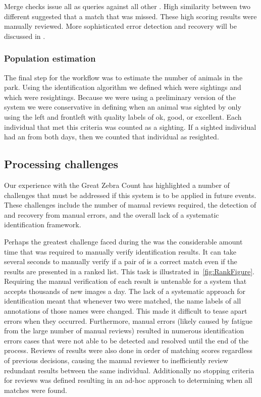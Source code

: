             Merge checks issue all \exemplars{} as queries against all other \exemplars{}. High similarity between
            two different \names{} suggested that a match that was missed. These high scoring results were manually
            reviewed. More sophisticated error detection and recovery will be discussed in .

        \subsubsection{Population estimation}
            The final step for the \GZC{} workflow was to estimate the number of animals in the park.  Using the
            identification algorithm we defined which \annots{} were sightings and which were resightings. Because we
            were using a preliminary version of the system we were conservative in defining when an animal was sighted
            by only using the left and frontleft \annots{} with quality labels of ok, good, or excellent.  Each
            individual that met this criteria was counted as a sighting.  If a sighted individual had an \annot{} from
            both days, then we counted that individual as resighted.

    \subsection{Processing challenges}
        Our experience with the Great Zebra Count has highlighted a number of challenges that must be addressed if this
        system is to be applied in future events. These challenges include the number of manual reviews required, the
        detection of and recovery from manual errors, and the overall lack of a systematic identification framework.

        Perhaps the greatest challenge faced during the \GZC{} was the
          considerable amount time that was required to manually verify
          identification results.
        It can take several seconds to manually verify if a pair of \annots{}
          is a correct match even if the results are presented in a ranked list.
        This task is illustrated in~\cref{fig:RankFigure}.
        Requiring the manual verification of each result is untenable for a
          system that accepts thousands of new images a day.
        The lack of a systematic approach for identification meant that
          whenever two \annots{} were matched, the name labels of all
          annotations of those names were changed.
        This made it difficult to tease apart errors when they occurred.
        Furthermore, manual errors (likely caused by fatigue from the large
          number of manual reviews) resulted in numerous identification errors
          cases that were not able to be detected and resolved until the end of
          the process.
        Reviews of results were also done in order of matching scores
          regardless of previous decisions, causing the manual reviewer to
          inefficiently review redundant results between the same individual.
        Additionally no stopping criteria for reviews was defined resulting in
          an ad-hoc approach to determining when all matches were found.

